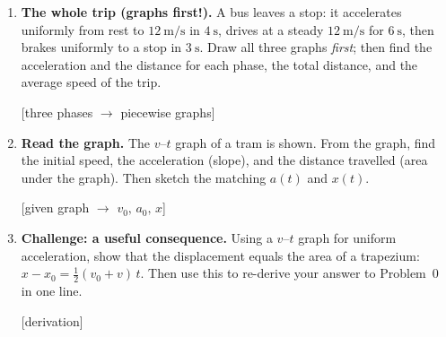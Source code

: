 \documentclass[11pt,a4paper]{article}
\newcommand{\given}[1]{\par\noindent\hfill{\small\color{muted}[#1]}\par}
\newcommand{\given}[1]{}
\newcommand{\ms}{\ \mathrm{m/s}}
\begin{document}
\begin{enumerate}[label=\textcolor{accent}{\textbf{\arabic*.}}, leftmargin=1.9em,
                  itemsep=7pt, topsep=3pt, start=0]
\item \textbf{The whole trip (graphs first!).}
A bus leaves a stop: it accelerates uniformly from rest to $12\ms$ in $4\ \mathrm{s}$,
drives at a steady $12\ms$ for $6\ \mathrm{s}$, then brakes uniformly to a stop in
$3\ \mathrm{s}$. Draw all three graphs \emph{first}; then find the acceleration and the
distance for each phase, the total distance, and the average speed of the trip.
\given{three phases \;$\to$\; piecewise graphs}

\item \textbf{Read the graph.}
The $v$--$t$ graph of a tram is shown. From the graph, find the initial speed, the
acceleration (slope), and the distance travelled (area under the graph). Then sketch the
matching $a(t)$ and $x(t)$. \given{given graph \;$\to$\; $v_0,\,a_0,\,x$}

\begin{center}
\end{center}

\item \textbf{Challenge: a useful consequence.}
Using a $v$--$t$ graph for uniform acceleration, show that the displacement equals the
area of a trapezium: $x-x_0 = \tfrac{1}{2}(v_0+v)\,t$. Then use this to re-derive your answer
to Problem~0 in one line. \given{derivation}

\end{enumerate}
\end{document}
